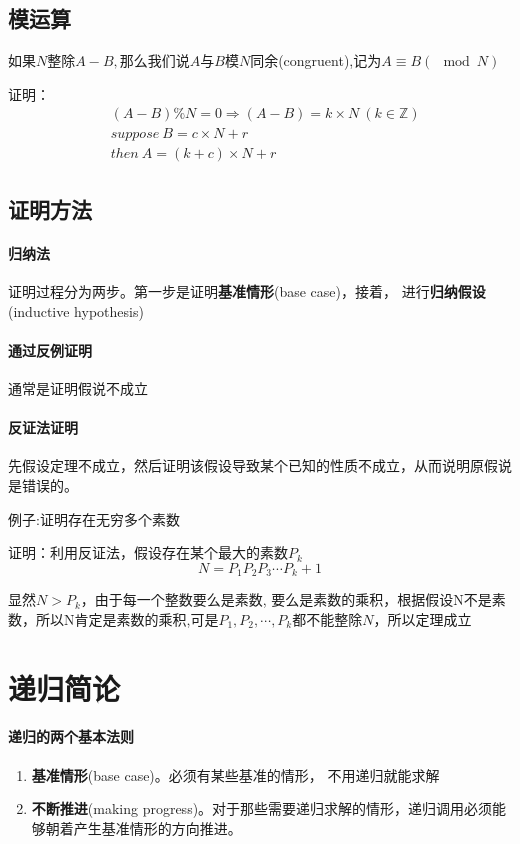 \documentclass[utf8]{ctexbook}
\begin{document}
\subsection{模运算}
$如果N整除A-B, 那么我们说A与B模N同余$(congruent),记为$A\equiv B(\mod N)$

证明： 
\begin{align*}
    &(A-B)\%N   = 0 \Rightarrow (A-B) = k\times N \ (k\in \mathbb{Z})
 \\ &suppose\ B = c\times N + r 
 \\ & then\ A = (k+c)\times N +r
\end{align*}
\subsection{证明方法}
\paragraph{归纳法} 
证明过程分为两步。第一步是证明\textbf{基准情形}(base case)，接着，
进行\textbf{归纳假设}(inductive hypothesis)
\paragraph{通过反例证明}

通常是证明假说不成立
\paragraph{反证法证明}
先假设定理不成立，然后证明该假设导致某个已知的性质不成立，从而说明原假说是错误的。

例子:证明存在无穷多个素数

证明：利用反证法，假设存在某个最大的素数$P_k$
\[N = P_1P_2P_3\cdots P_k + 1\]

显然$N>P_k$，由于每一个整数要么是素数, 要么是素数的乘积，根据假设N不是素数，所以N肯定是素数的乘积,可是$P_1,P_2,\cdots,P_k$都不能整除$N$，所以定理成立
\section{递归简论}
\paragraph{递归的两个基本法则}
\begin{enumerate}
    \item \textbf{基准情形}(base case)。必须有某些基准的情形， 不用递归就能求解
    \item \textbf{不断推进}(making progress)。对于那些需要递归求解的情形，递归调用必须能够朝着产生基准情形的方向推进。
\end{enumerate}
\end{document}
